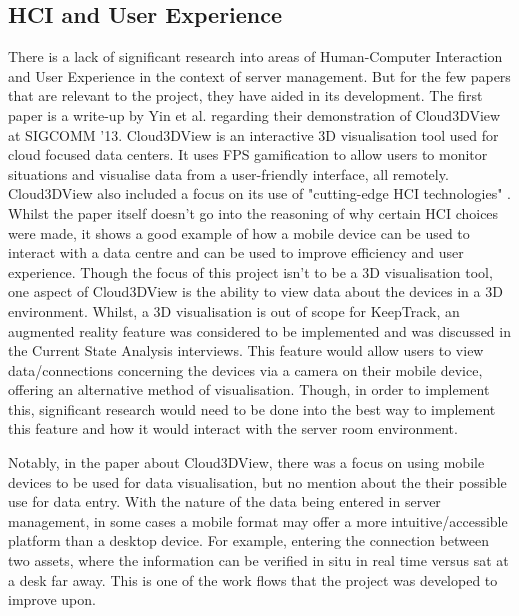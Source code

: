 \documentclass [11pt,a4paper]{article}
\begin{document}
\subsection{HCI and User Experience}
\label{sec:HCI}
There is a lack of significant research into areas of Human-Computer Interaction and User Experience in the context of server management. But for the few papers that are relevant to the project, they have aided in its development. The first paper is a write-up by Yin et al. \cite{cloud3dview} regarding their demonstration of Cloud3DView at SIGCOMM '13. Cloud3DView is an interactive 3D visualisation tool used for cloud focused data centers. It uses FPS gamification to allow users to monitor situations and visualise data from a user-friendly interface, all remotely. Cloud3DView also included a focus on its use of "cutting-edge HCI technologies" \cite{cloud3dview}. Whilst the paper itself doesn't go into the reasoning of why certain HCI choices were made, it shows a good example of how a mobile device can be used to interact with a data centre and can be used to improve efficiency and user experience. Though the focus of this project isn't to be a 3D visualisation tool, one aspect of Cloud3DView is the ability to view data about the devices in a 3D environment. Whilst, a 3D visualisation is out of scope for KeepTrack, an augmented reality feature was considered to be implemented and was discussed in the Current State Analysis interviews. This feature would allow users to view data/connections concerning the devices via a camera on their mobile device, offering an alternative method of visualisation. Though, in order to implement this, significant research would need to be done into the best way to implement this feature and how it would interact with the server room environment.

Notably, in the paper about Cloud3DView, there was a focus on using mobile devices to be used for data visualisation, but no mention about the their possible use for data entry. With the nature of the data being entered in server management, in some cases a mobile format may offer a more intuitive/accessible platform than a desktop device. For example, entering the connection between two assets, where the information can be verified in situ in real time versus sat at a desk far away. This is one of the work flows that the project was developed to improve upon.
\end{document}
